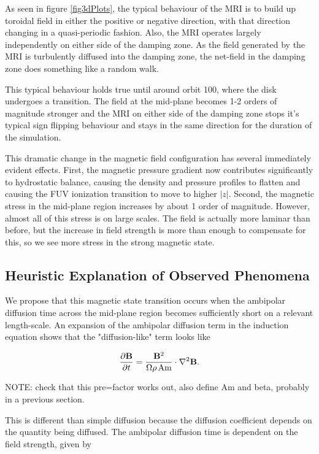 As seen in figure \ref{fig3dPlots}, the typical behaviour of the MRI is to build up toroidal field in either the positive or negative direction, with that direction changing in a quasi-periodic fashion.  Also, the MRI operates largely independently on either side of the damping zone.  As the field generated by the MRI is turbulently diffused into the damping zone, the net-field in the damping zone does something like a random walk.  

This typical behaviour holds true until around orbit 100, where the disk undergoes a transition.  The field at the mid-plane becomes 1-2 orders of magnitude stronger and the MRI on either side of the damping zone stops it's typical sign flipping behaviour and stays in the same direction for the duration of the simulation.

This dramatic change in the magnetic field configuration has several immediately evident effects.  First, the magnetic pressure gradient now contributes significantly to hydrostatic balance, causing the density and pressure profiles to flatten and causing the FUV ionization transition to move to higher $|z|$.  Second, the magnetic stress in the mid-plane region increases by about 1 order of magnitude.  However, almost all of this stress is on large scales.  The field is actually more laminar than before, but the increase in field strength is more than enough to compensate for this, so we see more stress in the strong magnetic state.


\subsection{Heuristic Explanation of Observed Phenomena}
We propose that this magnetic state transition occurs when the ambipolar diffusion time across the mid-plane region becomes sufficiently short on a relevant length-scale.  An expansion of the ambipolar diffusion term in the induction equation shows that the "diffusion-like" term looks like

\begin{equation}
\frac{\partial \bold{B}}{\partial t} = \frac{\bold{B}^2}{\Omega \rho \hspace{0.5mm} \text{Am}} \cdot \nabla^2 \bold{B}.
\end{equation}

\noindent NOTE: check that this pre=factor works out, also define Am and beta, probably in a previous section.

\noindent This is different than simple diffusion because the diffusion coefficient depends on the quantity being diffused.  The ambipolar diffusion time is dependent on the field strength, given by 

